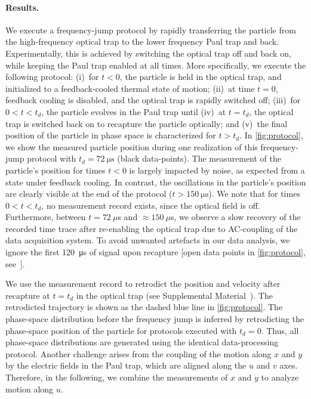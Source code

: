 \paragraph*{Results.}
We execute a frequency-jump protocol by rapidly transferring the particle from the high-frequency optical trap to the lower frequency Paul trap and back.
Experimentally, this is achieved by switching the optical trap off and back on, while keeping the Paul trap enabled at all times.
More specifically, we execute the following protocol:
(i)~for $t<0$, the particle is held in the optical trap, and initialized to a feedback-cooled thermal state of motion;
(ii)~at time $t=0$, feedback cooling is disabled, and the optical trap is rapidly switched off;
(iii)~for $0<t<t_d$, the particle evolves in the Paul trap until
(iv)~at $t=t_d$, the optical trap is switched back on to recapture the particle optically; and
(v)~the final position of the particle in phase space is characterized for $t>t_d$.
In \cref{fig:protocol}, we show the measured particle position during one realization of this frequency-jump protocol with $t_d = \SI{72}{\micro\second}$ (black data-points). 
The measurement of the particle's position for times $t<0$ is largely impacted by noise, as expected from a state under feedback cooling. In contrast, the oscillations in the particle's position are clearly visible at the end of the protocol ($t>\SI{150}{\micro\second}$). 
We note that for times $0<t<t_d$, no measurement record exists, since the optical field is off. Furthermore, between $t=72~\mu$s and $\approx150~\mu$s,  we observe a slow recovery of the recorded time trace after re-enabling the optical trap due to AC-coupling of the data acquisition system.
To avoid unwanted artefacts in our data analysis, we ignore the first \SI{120}{\micro\second} of signal upon recapture [open data points in \cref{fig:protocol}, see~\cite{supplemental}].

We use the measurement record to retrodict the position and velocity after recapture at $t=t_d$ in the optical trap (see Supplemental Material~\cite{supplemental}). The retrodicted trajectory is shown as the dashed blue line in \cref{fig:protocol}.
The phase-space distribution before the frequency jump is inferred by retrodicting the phase-space position of the particle for protocols executed with $t_d=0$. Thus, all phase-space distributions are generated using the identical data-processing protocol.
%
Another challenge arises from the coupling of the motion along $x$ and $y$ by the electric fields in the Paul trap, which are aligned along the $u$ and $v$ axes. Therefore, in the following, we combine the measurements of $x$ and $y$ to analyze motion along $u$.



